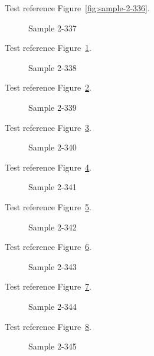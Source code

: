 Test reference Figure~\ref{fig:sample-2-336}.

\begin{figure}[tbhp]
\caption{Sample 2-337}
\label{fig:sample-2-337}
\end{figure}

Test reference Figure~\ref{fig:sample-2-337}.

\begin{figure}[tbhp]
\caption{Sample 2-338}
\label{fig:sample-2-338}
\end{figure}

Test reference Figure~\ref{fig:sample-2-338}.

\begin{figure}[tbhp]
\caption{Sample 2-339}
\label{fig:sample-2-339}
\end{figure}

Test reference Figure~\ref{fig:sample-2-339}.

\begin{figure}[tbhp]
\caption{Sample 2-340}
\label{fig:sample-2-340}
\end{figure}

Test reference Figure~\ref{fig:sample-2-340}.

\begin{figure}[tbhp]
\caption{Sample 2-341}
\label{fig:sample-2-341}
\end{figure}

Test reference Figure~\ref{fig:sample-2-341}.

\begin{figure}[tbhp]
\caption{Sample 2-342}
\label{fig:sample-2-342}
\end{figure}

Test reference Figure~\ref{fig:sample-2-342}.

\begin{figure}[tbhp]
\caption{Sample 2-343}
\label{fig:sample-2-343}
\end{figure}

Test reference Figure~\ref{fig:sample-2-343}.

\begin{figure}[tbhp]
\caption{Sample 2-344}
\label{fig:sample-2-344}
\end{figure}

Test reference Figure~\ref{fig:sample-2-344}.

\begin{figure}[tbhp]
\caption{Sample 2-345}
\label{fig:sample-2-345}
\end{figure}

